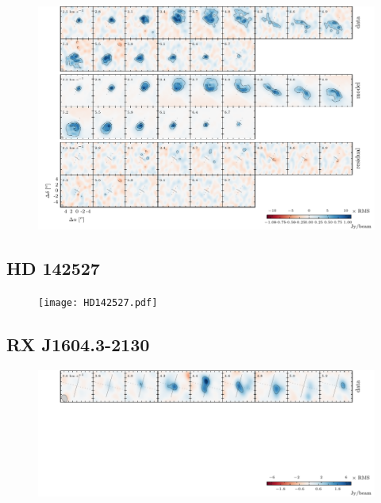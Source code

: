 \documentclass{aastex6}
\begin{document}
\begin{figure}[htb]
\begin{center}
  \includegraphics{IMLup.pdf}
  \end{center}
\end{figure}

\subsection{HD 142527}




\begin{figure}[htb]
\begin{center}
  \texttt{[image: HD142527.pdf]}
  \end{center}
\end{figure}

\subsection{RX J1604.3-2130}

\begin{figure}[htb]
\begin{center}
  \includegraphics{RXJ1604.pdf}
  \end{center}
\end{figure}
\end{document}
